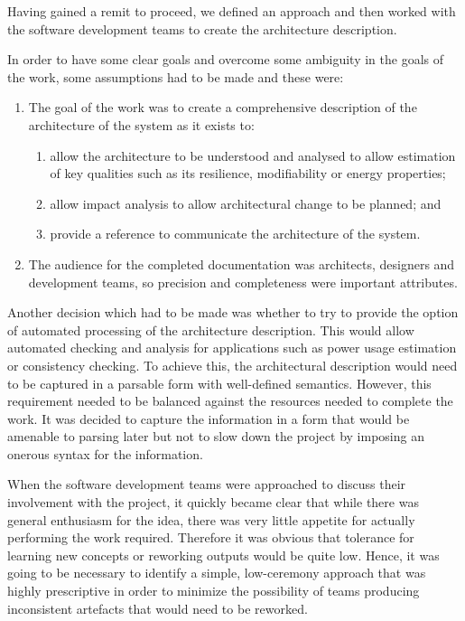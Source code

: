   Having gained a remit to proceed, we defined an approach and then worked with the software development teams to create the architecture description.

  In order to have some clear goals and overcome some ambiguity in the goals of the work, some assumptions had to be made and these were:

 \begin{enumerate}

\item The goal of the work was to create a comprehensive description of the architecture of the system as it exists to:
\begin{enumerate}
\item allow the architecture to be understood and analysed to allow estimation of key qualities such as its resilience, modifiability or energy properties;
\item allow impact analysis to allow architectural change to be planned; and 
\item provide a reference to communicate the architecture of the system.
\end{enumerate}

\item The audience for the completed documentation was architects, designers and development teams, so precision and completeness were important attributes.

\end{enumerate}

Another decision which had to be made was whether to try to provide the option of automated processing of the architecture description.  This would allow automated checking and analysis for applications such as power usage estimation or consistency checking.  To achieve this, the architectural description would need to be captured in a parsable form with well-defined semantics.  However, this requirement needed to be balanced against the resources needed to complete the work.  It was decided to capture the information in a form that would be amenable to parsing later but not to slow down the project by imposing an onerous syntax for the information.

When the software development teams were approached to discuss their involvement with the project, it quickly became clear that while there was general enthusiasm for the idea, there was very little appetite for actually performing the work required.  Therefore it was obvious that tolerance for learning new concepts or reworking outputs would be quite low.  Hence, it was going to be necessary to identify a simple, low-ceremony approach that was highly prescriptive in order to minimize the possibility of teams producing inconsistent artefacts that would need to be reworked.


